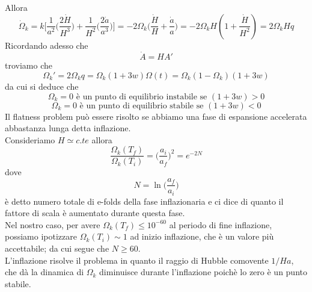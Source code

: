 \documentclass[10pt,a4paper]{article}
\theoremstyle{break}
\theoremstyle{remark}
\theoremstyle{definition}
\begin{document}
Allora
\[
\dot{\Omega}_k = k\bigg[\frac{1}{a^2}\bigg(\frac{2\dot{H}}{H^3}\bigg) + \frac{1}{H^2}\bigg(\frac{2\dot{a}}{a^3}\bigg)\bigg] = -2\Omega_k \bigg(\frac{\dot{H}}{H} + \frac{\dot{a}}{a}\bigg) = -2\Omega_k H (1 + \frac{\dot{H}}{H^2}) = 2\Omega_k H q
\]
Ricordando adesso che
\[
\dot{A} = HA'
\]
troviamo che
\[
\Omega_k' = 2 \Omega_k q = \Omega_k (1 + 3w) \Omega(t) = \Omega_k(1 - \Omega_k)(1 + 3w)
\]
da cui si deduce che
\[
\Omega_k = 0 \text{ è un punto di equilibrio instabile se } (1 + 3w)>0
\]
\[
\Omega_k = 0 \text{ è un punto di equilibrio stabile se } (1 + 3w)<0
\]
Il flatness problem può essere risolto se abbiamo una fase di espansione accelerata abbastanza lunga detta inflazione.\\
Consideriamo $H \simeq c.te$ allora
\[
\frac{\Omega_k(T_f)}{\Omega_k(T_i)} = \bigg(\frac{a_i}{a_f}\bigg)^2 = e^{-2N}
\]
dove 
\[
N = \ln\bigg(\frac{a_f}{a_i}\bigg)
\]
è detto numero totale di e-folds della fase inflazionaria e ci dice di quanto il fattore di scala è aumentato durante questa fase.\\
Nel nostro caso, per avere $\Omega_k (T_f) \le 10^{-60}$ al periodo di fine inflazione, possiamo ipotizzare $\Omega_k(T_i) \sim 1$ ad inizio inflazione, che è un valore più accettabile; da cui segue che $N \ge 60$.\\
L'inflazione risolve il problema in quanto il raggio di Hubble comovente $1/Ha$, che dà la dinamica di $\Omega_k$ diminuisce durante l'inflazione poichè lo zero è un punto stabile.
\end{document}
